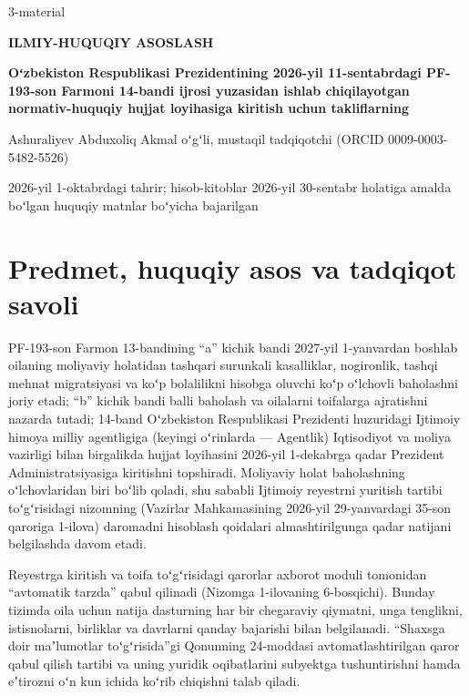 \documentclass[12pt,a4paper]{extarticle}
\begin{document}
\begin{flushright}3-material\end{flushright}
\begin{center}
\textbf{ILMIY-HUQUQIY ASOSLASH}\par
\textbf{Oʻzbekiston Respublikasi Prezidentining 2026-yil 11-sentabrdagi PF-193-son Farmoni 14-bandi ijrosi yuzasidan ishlab chiqilayotgan normativ-huquqiy hujjat loyihasiga kiritish uchun takliflarning}\par
\medskip
Ashuraliyev Abduxoliq Akmal oʻgʻli, mustaqil tadqiqotchi (ORCID 0009-0003-5482-5526)\par
2026-yil 1-oktabrdagi tahrir; hisob-kitoblar 2026-yil 30-sentabr holatiga amalda boʻlgan huquqiy matnlar boʻyicha bajarilgan
\end{center}

\section{Predmet, huquqiy asos va tadqiqot savoli}
PF-193-son Farmon 13-bandining “a” kichik bandi 2027-yil 1-yanvardan boshlab oilaning moliyaviy holatidan tashqari surunkali kasalliklar, nogironlik, tashqi mehnat migratsiyasi va koʻp bolalilikni hisobga oluvchi koʻp oʻlchovli baholashni joriy etadi; “b” kichik bandi balli baholash va oilalarni toifalarga ajratishni nazarda tutadi; 14-band Oʻzbekiston Respublikasi Prezidenti huzuridagi Ijtimoiy himoya milliy agentligiga (keyingi oʻrinlarda — Agentlik) Iqtisodiyot va moliya vazirligi bilan birgalikda hujjat loyihasini 2026-yil 1-dekabrga qadar Prezident Administratsiyasiga kiritishni topshiradi\cite{ref1}. Moliyaviy holat baholashning oʻlchovlaridan biri boʻlib qoladi, shu sababli Ijtimoiy reyestrni yuritish tartibi toʻgʻrisidagi nizomning (Vazirlar Mahkamasining 2026-yil 29-yanvardagi 35-son qaroriga 1-ilova) daromadni hisoblash qoidalari almashtirilgunga qadar natijani belgilashda davom etadi\cite{ref2}.

Reyestrga kiritish va toifa toʻgʻrisidagi qarorlar axborot moduli tomonidan “avtomatik tarzda” qabul qilinadi (Nizomga 1-ilovaning 6-bosqichi)\cite{ref2}. Bunday tizimda oila uchun natija dasturning har bir chegaraviy qiymatni, unga tenglikni, istisnolarni, birliklar va davrlarni qanday bajarishi bilan belgilanadi. “Shaxsga doir maʼlumotlar toʻgʻrisida”gi Qonunning 24-moddasi avtomatlashtirilgan qaror qabul qilish tartibi va uning yuridik oqibatlarini subyektga tushuntirishni hamda eʼtirozni oʻn kun ichida koʻrib chiqishni talab qiladi\cite{ref9}.
\end{document}
